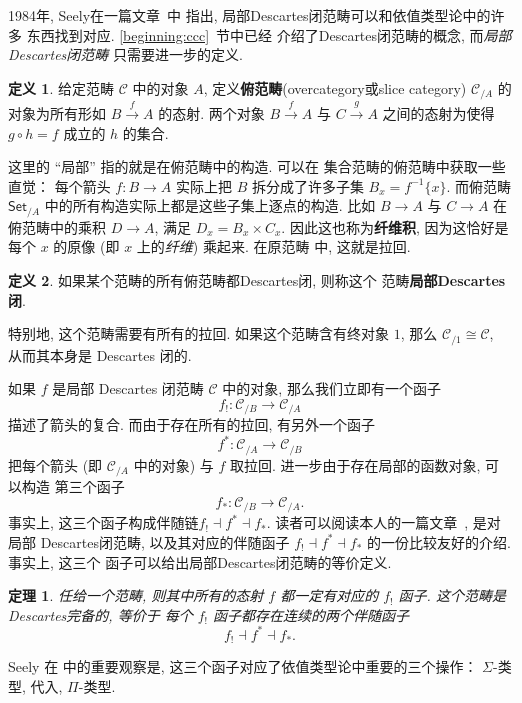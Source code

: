 \documentclass[UTF8]{ctexbook}
\theoremstyle{plain}
\newtheorem{theorem}{定理}[chapter]
\theoremstyle{definition}
\newtheorem{definition}{定义}[chapter]
\theoremstyle{remark}
\begin{document}
1984年, Seely在一篇文章~\cite{seely:1984:lccc}中
指出, 局部Descartes闭范畴可以和依值类型论中的许多
东西找到对应. \ref{beginning:ccc}~节中已经
介绍了Descartes闭范畴的概念, 而\emph{局部Descartes闭范畴}
只需要进一步的定义.
\begin{definition}
给定范畴 \(\mathcal C\) 中的对象 \(A\),
定义\textbf{俯范畴}(overcategory或slice category)
\(\mathcal C_{/A}\) 的对象为所有形如
\(B \xrightarrow{f} A\) 的态射. 两个对象
\(B \xrightarrow f A\) 与 \(C \xrightarrow g A\)
之间的态射为使得 \(g \circ h = f\) 成立的 \(h\) 的集合.
\end{definition}
这里的 “局部” 指的就是在俯范畴中的构造. 可以在
集合范畴的俯范畴中获取一些直觉： 每个箭头
\(f : B \to A\) 实际上把 \(B\) 拆分成了许多子集
\(B_x = f^{-1}\{x\}\). 而俯范畴 \(\textsf{Set}_{/A}\)
中的所有构造实际上都是这些子集上逐点的构造. 比如
\(B \to A\) 与 \(C \to A\) 在俯范畴中的乘积
\(D \to A\), 满足 \(D_x = B_x \times C_x\).
因此这也称为\textbf{纤维积}, 因为这恰好是每个 \(x\)
的原像 (即 \(x\) 上的\emph{纤维}) 乘起来. 在原范畴
中, 这就是拉回.
\begin{definition}
如果某个范畴的所有俯范畴都Descartes闭, 则称这个
范畴\textbf{局部Descartes闭}.
\end{definition}
特别地, 这个范畴需要有所有的拉回. 如果这个范畴含有终对象
\(1\), 那么 \(\mathcal C_{/1} \cong \mathcal C\),
从而其本身是 Descartes 闭的.

如果 \(f\) 是局部 Descartes 闭范畴 \(\mathcal C\)
中的对象, 那么我们立即有一个函子
\[f_! : \mathcal C_{/B} \to \mathcal C_{/A}\]
描述了箭头的复合. 而由于存在所有的拉回, 有另外一个函子
\[f^* : \mathcal C_{/A} \to \mathcal C_{/B}\]
把每个箭头 (即 \(\mathcal C_{/A}\) 中的对象) 与
\(f\) 取拉回. 进一步由于存在局部的函数对象, 可以构造
第三个函子
\[f_* : \mathcal C_{/B} \to \mathcal C_{/A}.\]
事实上, 这三个函子构成伴随链\(f_!\dashv f^*\dashv f_*\).
读者可以阅读本人的一篇文章~\cite{me:2022:lccc}, 是对局部
Descartes闭范畴, 以及其对应的伴随函子 \(f_!\dashv
f^*\dashv f_*\) 的一份比较友好的介绍. 事实上, 这三个
函子可以给出局部Descartes闭范畴的等价定义.
\begin{theorem}
任给一个范畴, 则其中所有的态射 \(f\) 都一定有对应的
\(f_!\) 函子. 这个范畴是Descartes完备的, 等价于
每个 \(f_!\) 函子都存在连续的两个伴随函子
\[f_!\dashv f^*\dashv f_*.\]
\end{theorem}

Seely 在 \cite{seely:1984:lccc} 中的重要观察是,
这三个函子对应了依值类型论中重要的三个操作：
\(\Sigma\)-类型, 代入, \(\Pi\)-类型.
\end{document}
